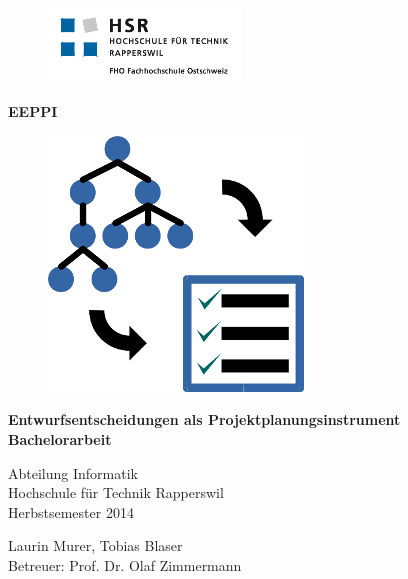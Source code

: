 \documentclass[ngerman,a4paper,12pt]{scrreprt}
\author{Laurin Murer, Tobias Blaser}
\title{\documentType \project}
\date{\today{}, Rapperswil}
\providecommand{\project}{Entwurfsentscheidungen als Projektplanungsinstrument}
\providecommand{\teacher}{Prof. Dr. Olaf Zimmermann}
\begin{document}
\thispagestyle{empty}
\begin{titlepage}
	\begin{figure}[htp]
		\includegraphics[height=2cm]{media/img/logoHSR.png}
	\end{figure}	
	
	\begin{center}

		\vspace*{0.5cm}
		{\fontsize{50}{40} \selectfont \textbf{EEPPI} \\[10mm]}
	
		\begin{figure}[htp]
			\centering
			\includegraphics[scale=0.40]{media/img/eeppiLogo.png}
		\end{figure}		
		\vspace*{1cm}	
	
		{\fontsize{28}{40} \selectfont \textbf{\project} \\[10mm]}
		{\fontsize{22}{40} \selectfont \textbf{Bachelorarbeit} \\[10mm]}
	
		{\fontsize{18}{20} \selectfont 
			Abteilung Informatik\\
			Hochschule für Technik Rapperswil \\
				
			\vspace*{1cm}
			Herbstsemester 2014\\
		}
		
		\vspace*{2cm}
		Laurin Murer, Tobias Blaser \\
		Betreuer: \teacher

	\end{center}
\end{titlepage}
\clearpage
\end{document}
